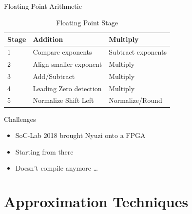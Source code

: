 \documentclass{beamer}
\begin{document}
\begin{frame}{Floating Point Arithmetic}


\begin{table}[]
    \centering
    \begin{tabular}{l|l|l}
         Stage & Addition & Multiply \\ \hline \hline
         1 & Compare exponents & Subtract exponents \\
         2 & Align smaller exponent & Multiply\\
         3 & Add/Subtract & Multiply \\
         4 & Leading Zero detection & Multiply \\
         5 & Normalize Shift Left & Normalize/Round\\ \hline
    \end{tabular}
    \caption{Floating Point Stage}
    \label{tab:nyuzi_fpu}
\end{table}
    
\end{frame}

\begin{frame}{Challenges}
    \begin{itemize}
        \item<1-> SoC-Lab 2018 brought Nyuzi onto a FPGA\cite{NyuziKessler}
        \item<2-> Starting from there
        \item<3-> Doesn't compile anymore \ldots
    \end{itemize}
\end{frame}

\section{Approximation Techniques}
\end{document}
